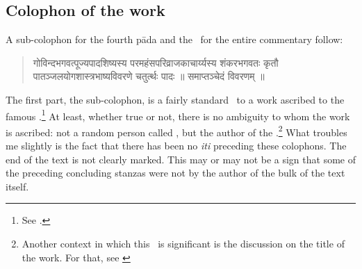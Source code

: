 \subsection{Colophon of the work}
\label{WORKCOL}
A sub-colophon for the fourth pāda and the \colophon\ for the entire commentary follow:
\begin{quote}
{\dn गोविन्दभगवत्पूज्यपादशिष्यस्य परमहंसपरिव्राजकाचार्य्यस्य शंकरभगवतः कृतौ पातञ्जलयोगशास्त्रभाष्यविवरणे चतुर्त्थः पादः ॥ समाप्तञ्चेदं विवरणम् ॥}
\end{quote}
The first part, the sub-colophon, is a fairly standard \colophon\ to a work ascribed to the famous \Sankara.\footnote{See \citet{hacker:avsbhkl}.} At least, whether true or not, there is no ambiguity to whom the work is ascribed: not a random person called \Sankara, but the author of the \BSBh.\footnote{Another context in which this \colophon\ is significant is the discussion on the title of the work. For that, see \citet[17]{wezler:yvi1}} What troubles me slightly is the fact that there has been no \emph{iti} preceding these colophons. The end of the text is not clearly marked. This may or may not be a sign that some of the preceding concluding stanzas were not by the author of the bulk of the text itself.

